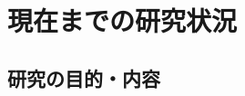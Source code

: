 \documentclass[11pt,a4paper,twoside]{jarticle}
\newcommand{\研究課題名}{象の卵}
\newcommand{\研究機関名}{逢坂大学}
\newcommand{\申請者氏名}{湯川秀樹}
\newcommand{\研究代表者氏名}{\申請者氏名}
\newcommand{\研究期間の最終元号年度}{29}	%
\begin{document}

\section{現在までの研究状況}
\newcommand{\研究の背景}{%
	象の卵の研究の背景は．．．

	\begin{thebibliography}{99}
		\bibitem{teramura} 寺村輝夫、「ぼくは王様 - ぞうのたまごのたまごやき」.
	\end{thebibliography}
}

\newcommand{\現在までの研究状況}{%
	今までは、地球上で最大の生物、シロナガスクジラの卵の研究を進めようとしてきた。
	クジラの卵の場合は、高い水圧に耐える必要があるため、堅固の構造となっているはずであり、
	これが解明されれば、将来、深海潜水艇への応用も効く。
	しかし、シロナガスクジラの生息範囲が広い、海に潜っている時間が長い、
	生息数も減っている、などの原因により、
	卵を見つけることができなかった。
	
	そこで、\underline{地球で}最大の動物から、\underline{地上で}最大の動物に研究対象を変更する。

}

\subsection{研究の目的・内容}
\newcommand{\研究目的}{%
	象の卵の研究の目的は．．．
}

\newcommand{\研究の特色と独創的な点}{%
	象の卵の特色と独創的な点は．．．
}
\end{document}
